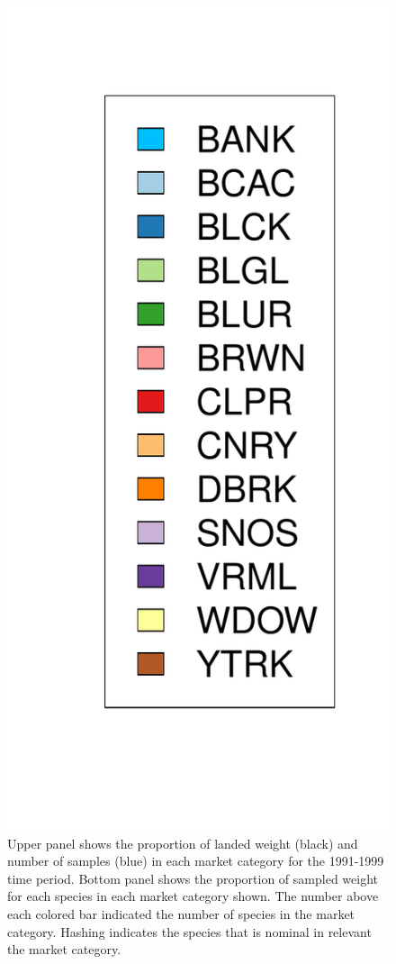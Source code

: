 \documentclass[12pt]{article}
\begin{document}
\begin{landscape}
\begin{figure}[h!]
\includegraphics[height=0.8\textheight]{./pictures/barplotLegend.pdf}
\caption{Upper panel shows the proportion of landed weight (black) and number of                 
samples (blue) in each market category for the 1991-1999 time period. Bottom panel 
shows the proportion of sampled weight for each species in each market category 
shown. The number above each colored bar indicated the number of species in 
the market category. Hashing indicates the species that is nominal in relevant 
the market category.}
\label{bar91}
\end{figure}
\end{landscape}
\end{document}
